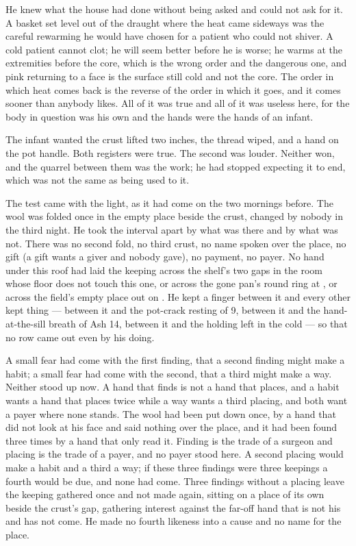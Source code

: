 He knew what the house had done without being asked and could not ask for it. A basket set level out of the draught where the heat came sideways was the careful rewarming he would have chosen for a patient who could not shiver. A cold patient cannot clot; he will seem better before he is worse; he warms at the extremities before the core, which is the wrong order and the dangerous one, and pink returning to a face is the surface still cold and not the core. The order in which heat comes back is the reverse of the order in which it goes, and it comes sooner than anybody likes. All of it was true and all of it was useless here, for the body in question was his own and the hands were the hands of an infant.

The infant wanted the crust lifted two inches, the thread wiped, and a hand on the pot handle. Both registers were true. The second was louder. Neither won, and the quarrel between them was the work; he had stopped expecting it to end, which was not the same as being used to it.

\scenebreak

The test came with the light, as it had come on the two mornings before. The wool was folded once in the empty place beside the crust, changed by nobody in the third night. He took the interval apart by what was there and by what was not. There was no second fold, no third crust, no name spoken over the place, no gift (a gift wants a giver and nobody gave), no payment, no payer. No hand under this roof had laid the keeping across the shelf's two gaps in the room whose floor does not touch this one, or across the gone pan's round ring at , or across the field's empty place out on . He kept a finger between it and every other kept thing — between it and the pot-crack resting of  9, between it and the hand-at-the-sill breath of Ash 14, between it and the holding  left in the cold  — so that no row came out even by his doing.

A small fear had come with the first finding, that a second finding might make a habit; a small fear had come with the second, that a third might make a way. Neither stood up now. A hand that finds is not a hand that places, and a habit wants a hand that places twice while a way wants a third placing, and both want a payer where none stands. The wool had been put down once, by a hand that did not look at his face and said nothing over the place, and it had been found three times by a hand that only read it. Finding is the trade of a surgeon and placing is the trade of a payer, and no payer stood here. A second placing would make a habit and a third a way; if these three findings were three keepings a fourth would be due, and none had come. Three findings without a placing leave the keeping gathered once and not made again, sitting on a place of its own beside the crust's gap, gathering interest against the far-off hand that is not his and has not come. He made no fourth likeness into a cause and no name for the place.

